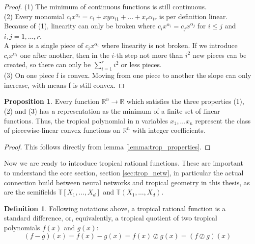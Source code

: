 \documentclass{article}
\theoremstyle{definition}
\newtheorem{definition}[theorem]{Definition}
\newtheorem{proposition}[theorem]{Proposition}
\begin{document}
\begin{proof}
(1) The minimum of continuous functions is still continuous. \\
(2) Every monomial $c_ix^{\alpha_i} = c_i + xy\alpha_{i1} + \dots + x_r \alpha_{ir}$ is per definition linear. Because of (1), linearity can only be broken where $c_i x^{\alpha_i} = c_j x^{\alpha_j}$ for $i \leq j$ and $i,j = 1, \dots ,r$. \\
A piece is a single piece of $c_ix^{\alpha_i}$ where linearity is not broken. If we introduce $c_ix^{\alpha_i}$ one after another, then in the $i$-th step not more than $i^2$ new pieces can be created, so there can only be $\displaystyle \sum_{i=1}^{r} i^2$ or less pieces. \\
(3) On one piece f is convex. Moving from one piece to another the slope can only increase, with means f is still convex.
\end{proof}

\begin{proposition}
Every function $\mathbb{R}^{n} \to \mathbb{R}$ which satisfies the three properties (1), (2) and (3) has a representation as the minimum of a finite set of linear functions. Thus, the tropical polynomial in n variables $x_{1}, \dots x_{n}$ represent the class of piecewise-linear convex functions on $\mathbb{R}^{n}$ with integer coefficients.
\end{proposition}

\begin{proof}
This follows directly from lemma \ref{lemma:trop_properties}.
\end{proof}

Now we are ready to introduce tropical rational functions. These are important to understand the core section, section \ref{sec:trop_netw}, in particular the actual connection build between neural networks and tropical geometry in this thesis, as are the semifields $\mathbb{T}[X_{1} , \dots , X_{d}]$ and $\mathbb{T}(X_{1} , \dots , X_{d})$.

\begin{definition} \cite[p.~3]{zhang2018tropical}
Following notations above, a tropical rational function is a standard difference, or, equivalently,
a tropical quotient of two tropical polynomials $f(x)$ and
$g(x)$:
$$ (f-g)(x) = f(x) - g(x) = f(x) \oslash g(x) = (f \oslash g)(x)$$
\end{definition}
\end{document}

